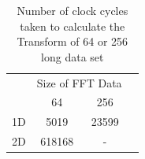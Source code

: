 \begin{table}
\centering
\caption{Number of clock cycles taken to calculate the Transform of 64 or 256 long data set}
\label{table:FFTSize_Time}
\begin{tabular}{|c|c|c|c|} \cline{2-3}
\multicolumn{1}{c|}{ } & \multicolumn{2}{|c|}{ Size of FFT Data } \\ \cline{2-3}
\multicolumn{1}{c|}{ } & 64 & 256 \\ \hline
					1D 	&	5019 	& 	23599		\\ \hline
				 	2D 	& 	618168 	& 	- 	\\ \hline
\end{tabular}
\end{table}

